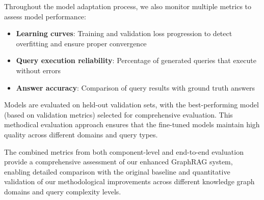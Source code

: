 Throughout the model adaptation process, we also monitor multiple metrics to assess model performance:

\begin{itemize}
    \item \textbf{Learning curves}: Training and validation loss progression to detect overfitting and ensure proper convergence
    \item \textbf{Query execution reliability}: Percentage of generated queries that execute without errors
    \item \textbf{Answer accuracy}: Comparison of query results with ground truth answers
\end{itemize}

Models are evaluated on held-out validation sets, with the best-performing model (based on validation metrics) selected for comprehensive evaluation. This methodical evaluation approach ensures that the fine-tuned models maintain high quality across different domains and query types.

The combined metrics from both component-level and end-to-end evaluation provide a comprehensive assessment of our enhanced GraphRAG system, enabling detailed comparison with the original baseline and quantitative validation of our methodological improvements across different knowledge graph domains and query complexity levels.